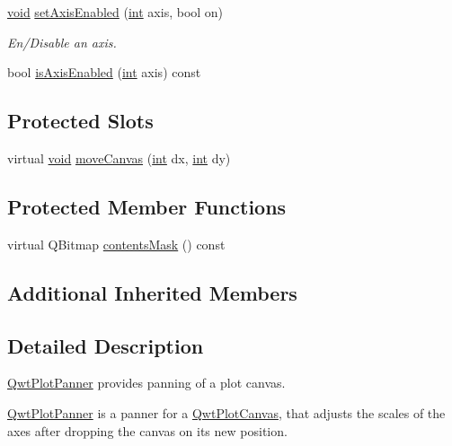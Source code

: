 \begin{DoxyCompactItemize}
\hyperlink{group___u_a_v_objects_plugin_ga444cf2ff3f0ecbe028adce838d373f5c}{void} \hyperlink{class_qwt_plot_panner_acbd5d67684c5a20ea0115e66f69540e4}{set\-Axis\-Enabled} (\hyperlink{ioapi_8h_a787fa3cf048117ba7123753c1e74fcd6}{int} axis, bool on)
\begin{DoxyCompactList}\small\item\em En/\-Disable an axis. \end{DoxyCompactList}\item 
bool \hyperlink{class_qwt_plot_panner_a30fc7de4bede9f191a96df42f86e704b}{is\-Axis\-Enabled} (\hyperlink{ioapi_8h_a787fa3cf048117ba7123753c1e74fcd6}{int} axis) const 
\end{DoxyCompactItemize}
\subsection*{Protected Slots}
\begin{DoxyCompactItemize}
\item 
virtual \hyperlink{group___u_a_v_objects_plugin_ga444cf2ff3f0ecbe028adce838d373f5c}{void} \hyperlink{class_qwt_plot_panner_aab045140de3e38d316593388da9231bd}{move\-Canvas} (\hyperlink{ioapi_8h_a787fa3cf048117ba7123753c1e74fcd6}{int} dx, \hyperlink{ioapi_8h_a787fa3cf048117ba7123753c1e74fcd6}{int} dy)
\end{DoxyCompactItemize}
\subsection*{Protected Member Functions}
\begin{DoxyCompactItemize}
\item 
virtual Q\-Bitmap \hyperlink{class_qwt_plot_panner_a01af550a710be3ca051610eda7f979e3}{contents\-Mask} () const 
\end{DoxyCompactItemize}
\subsection*{Additional Inherited Members}


\subsection{Detailed Description}
\hyperlink{class_qwt_plot_panner}{Qwt\-Plot\-Panner} provides panning of a plot canvas. 

\hyperlink{class_qwt_plot_panner}{Qwt\-Plot\-Panner} is a panner for a \hyperlink{class_qwt_plot_canvas}{Qwt\-Plot\-Canvas}, that adjusts the scales of the axes after dropping the canvas on its new position.


